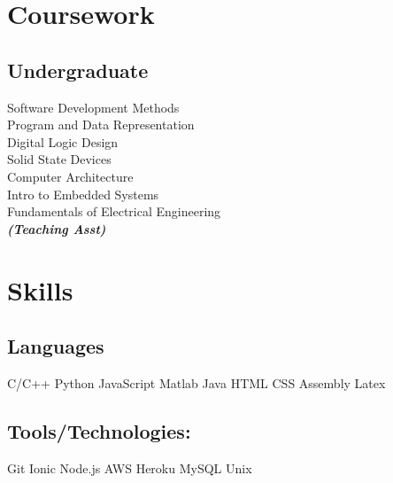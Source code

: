 \documentclass[]{deedy-resume-openfont}
\begin{document}
\begin{minipage}[t]{0.33\textwidth}
\section{Coursework}
\subsection{Undergraduate}
Software Development Methods \\
Program and Data Representation \\
Digital Logic Design \\
Solid State Devices \\
Computer Architecture \\
Intro to Embedded Systems \\
Fundamentals of Electrical Engineering \\
{\footnotesize \textit{\textbf{(Teaching Asst) }}} \\
\sectionsep


\section{Skills}
\subsection{Languages}
C/C++ \textbullet{}  Python  \textbullet{} JavaScript \textbullet{} Matlab   \textbullet{} Java   \textbullet{} HTML   \textbullet{} CSS   \textbullet{} Assembly \textbullet{} Latex \\
\sectionsep
\subsection{Tools/Technologies:}
Git \textbullet{} Ionic \textbullet{} Node.js \textbullet{} AWS \textbullet{} Heroku  \textbullet{} MySQL   \textbullet{} Unix \\
\sectionsep

%
%

\end{minipage} 
\hfill
\end{document}
